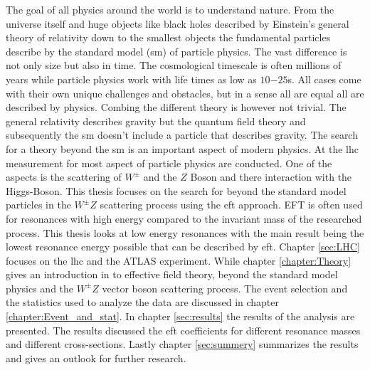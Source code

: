 \documentclass[../Bachelorarbeit.tex]{subfiles}
\begin{document}
The goal of all physics around the world is to understand nature. From the universe itself and huge objects like black holes described by Einstein's general theory of relativity down to the smallest objects the fundamental particles describe by the standard model (\acrshort{sm}) of particle physics.
The vast difference is not only size but also in time. The cosmological timescale is often millions of years while particle physics work with life times as low as $10{-25}$s.
All cases come with their own unique challenges and obstacles, but in a sense all are equal all are described by physics. Combing the different theory is however not trivial.
The general relativity describes gravity but the quantum field theory and subsequently the \acrshort{sm} doesn't include a particle that describes gravity. The search for a theory beyond the \acrshort{sm} is an important aspect of modern physics.
At the \acrfull{lhc} measurement for most aspect of particle physics are conducted. One of the aspects is the scattering of $W^{\pm }$ and the $Z$ Boson and there interaction with the Higgs-Boson.
This thesis focuses on the search for beyond the standard model particles in the $W^{\pm}Z$ scattering process using the \acrfull{eft} approach.
EFT is often used for resonances with high energy compared to the invariant mass of the researched process. This thesis looks at low energy resonances with the main result being the lowest resonance energy possible that can be described by \acrshort{eft}.
Chapter \ref{sec:LHC} focuses on the \acrfull{lhc} and the ATLAS experiment.
While chapter \ref{chapter:Theory} gives an introduction in to effective field theory, beyond the standard model physics and the $W^{\pm}Z$ vector boson scattering process. The event selection and the statistics used to analyze the data are discussed in chapter \ref{chapter:Event_and_stat}.
In chapter \ref{sec:results} the results of the analysis are presented. The results discussed the \acrshort{eft} coefficients for different resonance masses and different cross-sections.
Lastly chapter \ref{sec:summery} summarizes the results and gives an outlook for further research.
\end{document}
